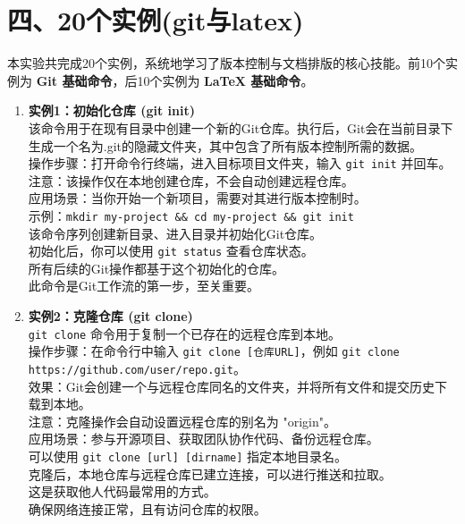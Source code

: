 \documentclass[a4paper, 12pt]{article}
\begin{document}
\section*{四、20个实例(git与latex)}
本实验共完成20个实例，系统地学习了版本控制与文档排版的核心技能。前10个实例为 \textbf{Git 基础命令}，后10个实例为 \textbf{LaTeX 基础命令}。


\begin{enumerate}
    \item \begin{tcolorbox}[instancestyle]
        \textbf{实例1：初始化仓库 (git init)} \\
        该命令用于在现有目录中创建一个新的Git仓库。执行后，Git会在当前目录下生成一个名为.git的隐藏文件夹，其中包含了所有版本控制所需的数据。\\
        操作步骤：打开命令行终端，进入目标项目文件夹，输入 \texttt{git init} 并回车。\\
        注意：该操作仅在本地创建仓库，不会自动创建远程仓库。\\
        应用场景：当你开始一个新项目，需要对其进行版本控制时。\\
        示例：\texttt{mkdir my-project \&\& cd my-project \&\& git init} \\
        该命令序列创建新目录、进入目录并初始化Git仓库。\\
        初始化后，你可以使用 \texttt{git status} 查看仓库状态。\\
        所有后续的Git操作都基于这个初始化的仓库。\\
        此命令是Git工作流的第一步，至关重要。
    \end{tcolorbox}

    \item \begin{tcolorbox}[instancestyle]
        \textbf{实例2：克隆仓库 (git clone)} \\
        \texttt{git clone} 命令用于复制一个已存在的远程仓库到本地。\\
        操作步骤：在命令行中输入 \texttt{git clone [仓库URL]}，例如 \texttt{git clone https://github.com/user/repo.git}。\\
        效果：Git会创建一个与远程仓库同名的文件夹，并将所有文件和提交历史下载到本地。\\
        注意：克隆操作会自动设置远程仓库的别名为 "origin"。\\
        应用场景：参与开源项目、获取团队协作代码、备份远程仓库。\\
        可以使用 \texttt{git clone [url] [dirname]} 指定本地目录名。\\
        克隆后，本地仓库与远程仓库已建立连接，可以进行推送和拉取。\\
        这是获取他人代码最常用的方式。\\
        确保网络连接正常，且有访问仓库的权限。
    \end{tcolorbox}


\end{enumerate}
\end{document}
